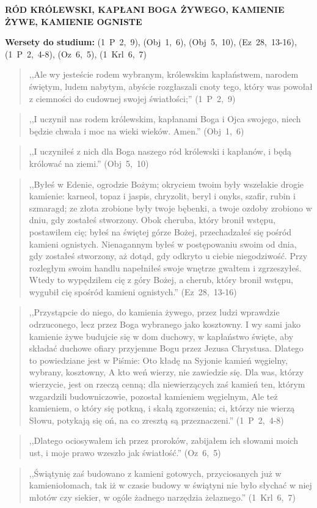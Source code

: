 \documentclass[10pt,a4paper,oneside]{article}
\begin{document}
\centerline{\textbf{\MakeUppercase{Ród Królewski, Kapłani Boga Żywego, Kamienie Żywe, Kamienie Ogniste}}}
\begin{center}
\textbf{Wersety do studium:} \mbox{(1 P 2, 9)}, \mbox{(Obj 1, 6)}, \mbox{(Obj 5, 10)}, \mbox{(Ez 28, 13-16)}, \mbox{(1 P 2, 4-8)}, \mbox{(Oz 6, 5)}, \mbox{(1 Krl 6, 7)}
\end{center}
\begin{quote}
,,Ale wy jesteście rodem wybranym, królewskim kapłaństwem, narodem świętym, ludem nabytym, abyście rozgłaszali cnoty tego, który was powołał z ciemności do cudownej swojej światłości;'' \mbox{(1 P 2, 9)}
\end{quote}
\begin{quote}
,,I uczynił nas rodem królewskim, kapłanami Boga i Ojca swojego, niech będzie chwała i moc na wieki wieków. Amen.'' \mbox{(Obj 1, 6)}
\end{quote}
\begin{quote}
,,I uczyniłeś z nich dla Boga naszego ród królewski i kapłanów, i będą królować na ziemi.'' \mbox{(Obj 5, 10)}
\end{quote}
\begin{quote}
,,Byłeś w Edenie, ogrodzie Bożym; okryciem twoim były wszelakie drogie kamienie: karneol, topaz i jaspis, chryzolit, beryl i onyks, szafir, rubin i szmaragd; ze złota zrobione były twoje bębenki, a twoje ozdoby zrobiono w dniu, gdy zostałeś stworzony. Obok cheruba, który bronił wstępu, postawiłem cię; byłeś na świętej górze Bożej, przechadzałeś się pośród kamieni ognistych. Nienagannym byłeś w postępowaniu swoim od dnia, gdy zostałeś stworzony, aż dotąd, gdy odkryto u ciebie niegodziwość. Przy rozległym swoim handlu napełniłeś swoje wnętrze gwałtem i zgrzeszyłeś. Wtedy to wypędziłem cię z góry Bożej, a cherub, który bronił wstępu, wygubił cię spośród kamieni ognistych.'' \mbox{(Ez 28, 13-16)}
\end{quote}
\begin{quote}
,,Przystąpcie do niego, do kamienia żywego, przez ludzi wprawdzie odrzuconego, lecz przez Boga wybranego jako kosztowny. I wy sami jako kamienie żywe budujcie się w dom duchowy, w kapłaństwo święte, aby składać duchowe ofiary przyjemne Bogu przez Jezusa Chrystusa. Dlatego to powiedziane jest w Piśmie: Oto kładę na Syjonie kamień węgielny, wybrany, kosztowny, A kto weń wierzy, nie zawiedzie się. Dla was, którzy wierzycie, jest on rzeczą cenną; dla niewierzących zaś kamień ten, którym wzgardzili budowniczowie, pozostał kamieniem węgielnym, Ale też kamieniem, o który się potkną, i skałą zgorszenia; ci, którzy nie wierzą Słowu, potykają się oń, na co zresztą są przeznaczeni.'' \mbox{(1 P 2, 4-8)}
\end{quote}
\begin{quote}
,,Dlatego ociosywałem ich przez proroków, zabijałem ich słowami moich ust, i moje prawo wzeszło jak światłość.'' \mbox{(Oz 6, 5)}
\end{quote}
\begin{quote}
,,Świątynię zaś budowano z kamieni gotowych, przyciosanych już w kamieniołomach, tak iż w czasie budowy w świątyni nie było słychać w niej młotów czy siekier, w ogóle żadnego narzędzia żelaznego.'' \mbox{(1 Krl 6, 7)}
\end{quote}
\end{document}
